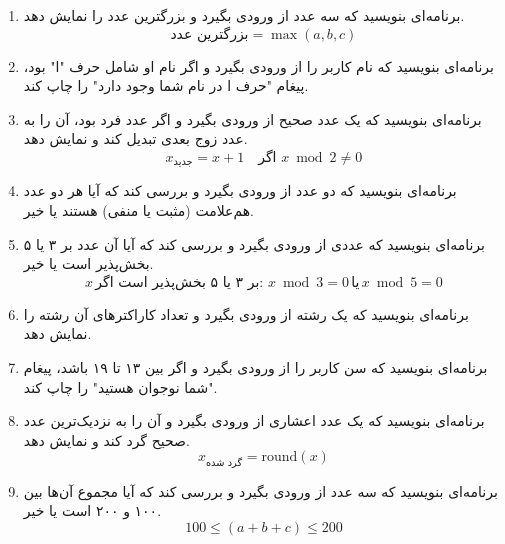 \documentclass[b5paper,12pt]{article}
\begin{document}
\begin{enumerate}
		\item برنامه‌ای بنویسید که سه عدد از ورودی بگیرد و بزرگترین عدد را نمایش دهد.
		\[
		\text{بزرگترین عدد} = \max(a, b, c)
		\]
		
		\item برنامه‌ای بنویسید که نام کاربر را از ورودی بگیرد و اگر نام او شامل حرف "ا" بود، پیغام "حرف ا در نام شما وجود دارد" را چاپ کند.
		
		\item برنامه‌ای بنویسید که یک عدد صحیح از ورودی بگیرد و اگر عدد فرد بود، آن را به عدد زوج بعدی تبدیل کند و نمایش دهد.
		\[
		x_{\text{جدید}} = x + 1 \quad \text{اگر } x \bmod 2 \neq 0
		\]
		
		\item برنامه‌ای بنویسید که دو عدد از ورودی بگیرد و بررسی کند که آیا هر دو عدد هم‌علامت (مثبت یا منفی) هستند یا خیر.
		
		\item برنامه‌ای بنویسید که عددی از ورودی بگیرد و بررسی کند که آیا آن عدد بر ۳ یا ۵ بخش‌پذیر است یا خیر.
		\[
		x \, \text{بر ۳ یا ۵ بخش‌پذیر است اگر: } x \bmod 3 = 0 \, \text{یا} \, x \bmod 5 = 0
		\]
		
		\item برنامه‌ای بنویسید که یک رشته از ورودی بگیرد و تعداد کاراکترهای آن رشته را نمایش دهد.
		
		\item برنامه‌ای بنویسید که سن کاربر را از ورودی بگیرد و اگر بین ۱۳ تا ۱۹ باشد، پیغام "شما نوجوان هستید" را چاپ کند.
		
		\item برنامه‌ای بنویسید که یک عدد اعشاری از ورودی بگیرد و آن را به نزدیک‌ترین عدد صحیح گرد کند و نمایش دهد.
		\[
		x_{\text{گرد شده}} = \text{round}(x)
		\]
		
		\item برنامه‌ای بنویسید که سه عدد از ورودی بگیرد و بررسی کند که آیا مجموع آن‌ها بین ۱۰۰ و ۲۰۰ است یا خیر.
		\[
		100 \leq (a + b + c) \leq 200
		\]
		
	\end{enumerate}
	
	\newpage
\end{document}
